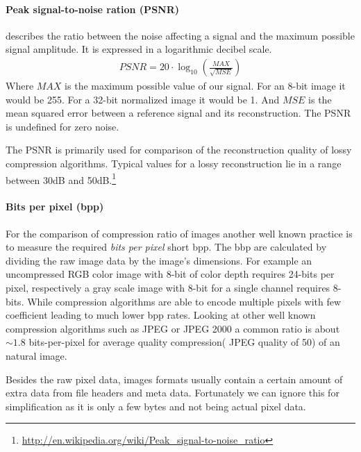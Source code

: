 \paragraph{Peak signal-to-noise ration (PSNR)} describes the ratio between the
noise affecting a signal and the maximum possible signal amplitude. It is
expressed in a logarithmic decibel scale.
\begin{align}
 PSNR = 20 \cdot \log_{10} \left(\frac{MAX}{\sqrt{MSE}}\right)
\end{align}
Where $MAX$ is the maximum possible value of our signal. For an 8-bit
image it would be 255. For a 32-bit normalized image it would be 1. And $MSE$ is
the mean squared error between a reference signal and its reconstruction. The
PSNR is undefined for zero noise.

The PSNR is primarily used for comparison of the reconstruction quality of
lossy compression algorithms. Typical values for a lossy reconstruction lie in
a range between 30dB and
50dB.\footnote{\url{http://en.wikipedia.org/wiki/Peak_signal-to-noise_ratio}}

\paragraph{Bits per pixel (bpp)} 
For the comparison of compression ratio of images another well known practice is
to measure the required \emph{bits per pixel} short bpp. The bbp are calculated
by dividing the raw image data by the image's dimensions. For example an
uncompressed RGB color image with 8-bit of color depth requires 24-bits per
pixel, respectively a gray scale image with 8-bit for a single channel requires
8-bits. While compression algorithms are able to encode multiple pixels with few
coefficient leading to much lower bpp rates.
Looking at other well known compression algorithms such as JPEG or
JPEG 2000 a common ratio is about $\sim1.8$ bits-per-pixel for average
quality compression( JPEG quality of 50) of an natural image. 


Besides the raw pixel data, images formats usually contain a certain amount
of extra data from file headers and meta data. Fortunately we can ignore this
for simplification as it is only a few bytes and not being actual pixel data.

